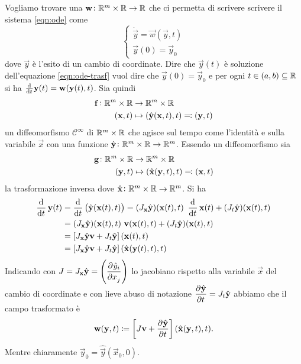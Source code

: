 Vogliamo trovare una $ \mathbf{w} \colon \mathbb{R}^m \times \mathbb{R} \to \mathbb{R} $ che ci permetta di scrivere scrivere il sistema \eqref{eqn:ode} come
\begin{equation} \label{eqn:ode-trasf}
    \begin{cases}
    \dot{\vec{y}} = \vec{w}(\vec{y}, t) \\
    \vec{y}(0) = \vec{y}_0
    \end{cases}
\end{equation}
dove $ \vec{y} $ è l'esito di un cambio di coordinate. Dire che $ \vec{y}(t) $ è soluzione dell'equazione \eqref{eqn:ode-trasf} vuol dire che $ \vec{y}(0) = \vec{y}_0 $ e per ogni $ t \in (a, b) \subseteq \mathbb{R} $ si ha $ \od{}{t} \vec{y}(t) = \vec{w}(\vec{y}(t), t) $. Sia quindi
\begin{align*}
    \mathbf{f} \colon \mathbb{R}^m \times \mathbb{R} & \to \mathbb{R}^m \times \mathbb{R} \\
    (\mathbf{x}, t) & \mapsto (\hat{\mathbf{y}}(\mathbf{x}, t), t) \eqqcolon (\mathbf{y}, t)
\end{align*}
un diffeomorfismo $ \mathcal{C}^\infty $  di $ \mathbb{R}^m \times \mathbb{R} $ che agisce sul tempo come l'identità e sulla variabile $ \vec{x} $ con una funzione $ \hat{\mathbf{y}} \colon \mathbb{R}^m \times \mathbb{R} \to \mathbb{R}^m $. Essendo un diffeomorfismo sia
\begin{align*}
    \mathbf{g} \colon \mathbb{R}^m \times \mathbb{R} & \to \mathbb{R}^m \times \mathbb{R} \\
    (\mathbf{y}, t) & \mapsto (\hat{\mathbf{x}}(\mathbf{y}, t), t) \eqqcolon (\mathbf{x}, t)
\end{align*}
la trasformazione inversa dove $ \hat{\mathbf{x}} \colon \mathbb{R}^m \times \mathbb{R} \to \mathbb{R}^m $. Si ha
\begin{align*}
    \dod{}{t} \vec{y}(t) & = \dod{}{t} \left( \hat{\vec{y}}(\vec{x}(t), t)\right) = (J_\vec{x} \hat{\vec{y}})(\vec{x}(t), t) \ \dod{}{t} \vec{x}(t)  + (J_t \hat{\vec{y}})(\vec{x}(t), t) \\
    & = (J_\vec{x} \hat{\vec{y}})(\vec{x}(t), t) \ \vec{v}(\vec{x}(t), t)  + (J_t \hat{\vec{y}})(\vec{x}(t), t) \\
    & = \left[J_\vec{x} \hat{\vec{y}} \vec{v} + J_t \hat{\vec{y}}\right] (\vec{x}(t), t) \\
    & = \left[J_\vec{x} \hat{\vec{y}} \vec{v} + J_t \hat{\vec{y}}\right] (\hat{\vec{x}}(\vec{y}(t), t), t)
\end{align*}
Indicando con $ J = J_\vec{x} \hat{\vec{y}} = \left(\dpd{\hat{y}_i}{x_j}\right) $ lo jacobiano rispetto alla variabile $ \vec{x} $ del cambio di coordinate e con lieve abuso di notazione $ \dpd{\hat{\vec{y}}}{t} = J_t \hat{\vec{y}} $ abbiamo che il campo trasformato è
\begin{equation}
    \vec{w}(\vec{y}, t) \coloneqq \left[ J \vec{v} + \dpd{\hat{\vec{y}}}{t}\right] (\hat{\vec{x}}(\vec{y}, t), t).
\end{equation}
Mentre chiaramente $ \vec{y}_0 = \hat{\vec{y}}(\vec{x}_0, 0) $.

